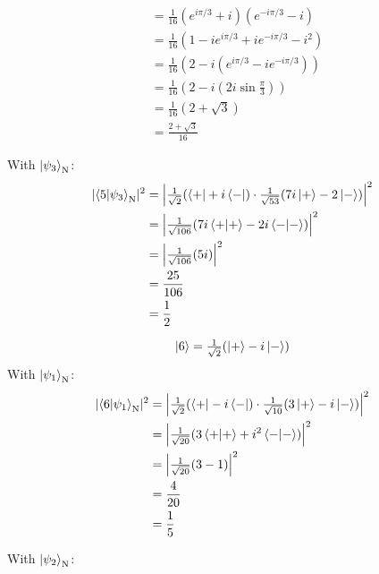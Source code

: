 \documentclass[11pt]{article}
\newcommand\abs[1]{\lvert#1\rvert}
\newcommand\Abs[1]{\left\lvert#1\right\rvert}
\begin{document}
\begin{enumerate}[label=\textbf{\arabic*.}, start=2]
{\begin{enumerate}[label=\textbf{(\alph*)}]
{\begin{align*}
                        &=\frac{1}{16}\left(e^{i\pi/3}+i\right)\left(e^{-i\pi/3}-i\right) \\
                        &=\frac{1}{16}\left(1-ie^{i\pi/3}+ie^{-i\pi/3}-i^2\right) \\
                        &=\frac{1}{16}\left(2-i(e^{i\pi/3}-ie^{-i\pi/3})\right) \\
                        &=\frac{1}{16}\left(2-i\left(2i\sin\tfrac{\pi}{3}\right)\right) \\
                        &=\frac{1}{16}\left(2+\sqrt 3\right) \\
                        &=\frac{2+\sqrt 3}{16}
                    \end{align*}
                    \par
                    With \(\ket{\psi_3}_\mathrm{N}\):
                    \begin{align*}
                        \abs{\braket{5|\psi_3}_\mathrm{N}}^2&=\Abs{\tfrac{1}{\sqrt 2}(\bra{+}+i\bra{-})\cdot\tfrac{1}{\sqrt{53}}(7i\ket{+}-2\ket{-})}^2 \\
                        &=\Abs{\tfrac{1}{\sqrt{106}}(7i\braket{+|+}-2i\braket{-|-})}^2 \\
                        &=\Abs{\tfrac{1}{\sqrt{106}}(5i)}^2 \\
                        &=\frac{25}{106} \\
                        &=\frac 1 2
                    \end{align*}
                    \par
                    {\boldmath \[\ket{6}=\tfrac{1}{\sqrt 2}(\ket{+}-i\ket{-})\]}
                    With \(\ket{\psi_1}_\mathrm{N}\):
                    \begin{align*}
                        \abs{\braket{6|\psi_1}_\mathrm{N}}^2&=\Abs{\tfrac{1}{\sqrt 2}(\bra{+}-i\bra{-})\cdot\tfrac{1}{\sqrt{10}}(3\ket{+}-i\ket{-})}^2 \\
                        &=\Abs{\tfrac{1}{\sqrt{20}}(3\braket{+|+}+i^2\braket{-|-})}^2 \\
                        &=\Abs{\tfrac{1}{\sqrt{20}}(3-1)}^2 \\
                        &=\frac{4}{20} \\
                        &=\frac 1 5
                    \end{align*}
                    \par
                    With \(\ket{\psi_2}_\mathrm{N}\):
                    \begin{align*}

\end{align*}}
\end{enumerate}}
\end{enumerate}
\end{document}
